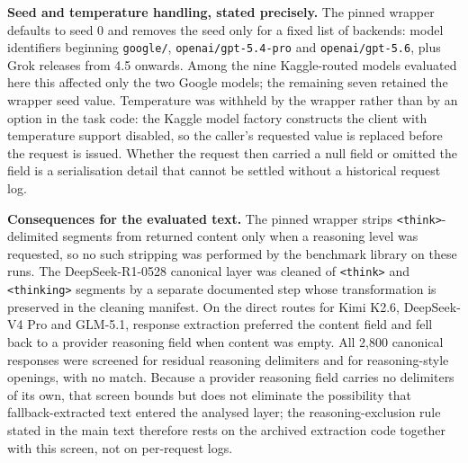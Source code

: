 \documentclass[10pt]{article}
\begin{document}
\textbf{Seed and temperature handling, stated precisely.} The pinned wrapper defaults to
seed 0 and removes the seed only for a fixed list of backends: model identifiers
beginning \texttt{google/}, \texttt{openai/gpt-5.4-pro} and \texttt{openai/gpt-5.6}, plus
Grok releases from 4.5 onwards. Among the nine Kaggle-routed models evaluated here this
affected only the two Google models; the remaining seven retained the wrapper seed value.
Temperature was withheld by the wrapper rather than by an option in the task code: the
Kaggle model factory constructs the client with temperature support disabled, so the
caller's requested value is replaced before the request is issued. Whether the request
then carried a null field or omitted the field is a serialisation detail that cannot be
settled without a historical request log.

\textbf{Consequences for the evaluated text.} The pinned wrapper strips
\texttt{<think>}-delimited segments from returned content only when a reasoning level was
requested, so no such stripping was performed by the benchmark library on these runs. The
DeepSeek-R1-0528 canonical layer was cleaned of \texttt{<think>} and \texttt{<thinking>}
segments by a separate documented step whose transformation is preserved in the cleaning
manifest. On the direct routes for Kimi K2.6, DeepSeek-V4 Pro and GLM-5.1, response
extraction preferred the content field and fell back to a provider reasoning field when
content was empty. All 2,800 canonical responses were screened for residual reasoning
delimiters and for reasoning-style openings, with no match. Because a provider reasoning
field carries no delimiters of its own, that screen bounds but does not eliminate the
possibility that fallback-extracted text entered the analysed layer; the
reasoning-exclusion rule stated in the main text therefore rests on the archived
extraction code together with this screen, not on per-request logs.
\end{document}

